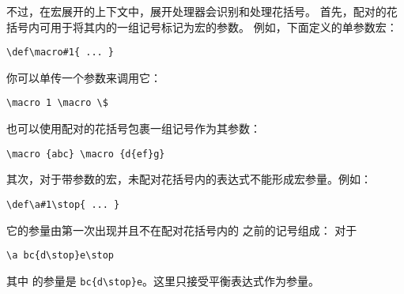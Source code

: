 \documentclass{book}
\begin{document}
不过，在宏展开的上下文中，展开处理器会识别和处理花括号。
首先，配对的花括号内可用于将其内的一组记号标记为宏的参数。
例如，下面定义的单参数宏：
\begin{verbatim}
\def\macro#1{ ... }
\end{verbatim}
你可以单传一个参数来调用它：
\begin{verbatim}
\macro 1 \macro \$
\end{verbatim}
也可以使用配对的花括号包裹一组记号作为其参数：
\begin{verbatim}
\macro {abc} \macro {d{ef}g}
\end{verbatim}

其次，对于带参数的宏，未配对花括号内的表达式不能形成宏参量。例如：
\begin{verbatim}
\def\a#1\stop{ ... }
\end{verbatim}
它的参量由第一次出现并且不在配对花括号内的  之前的记号组成：
对于
\begin{verbatim}
\a bc{d\stop}e\stop
\end{verbatim}
其中  的参量是 \verb>bc{d\stop}e>。这里只接受平衡表达式作为参量。

\end{document}
